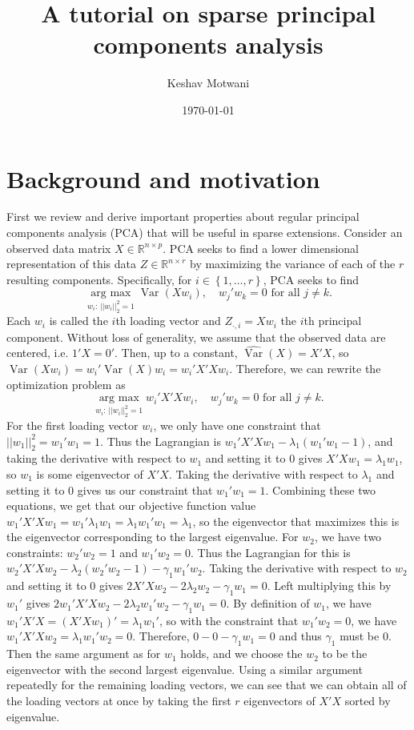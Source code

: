 \documentclass[11pt]{article}
\title{A tutorial on sparse principal components analysis}
\date{\today}
\author{Keshav Motwani}
\newcommand{\argmax}{\operatorname*{arg \ max}}
\newcommand{\var}{\operatorname*{Var}}
\begin{document}
\maketitle
\section{Background and motivation}
First we review and derive important properties about regular principal components analysis (PCA) that will be useful in sparse extensions. Consider an observed data matrix $X \in \mathbb{R}^{n \times p}$. PCA seeks to find a lower dimensional representation of this data $Z \in \mathbb{R}^{n \times r}$ by maximizing the variance of each of the $r$ resulting components. Specifically, for $i \in \left\{1, \dots, r \right\}$, PCA seeks to find
$$
\argmax_{w_i: \,||w_i||_2^2 = 1} \var(Xw_i), \quad w_j'w_k = 0 \text{ for all } j \neq k.
$$
Each $w_i$ is called the $i$th loading vector and $Z_{\cdot, i} = Xw_i$ the $i$th principal component. Without loss of generality, we assume that the observed data are centered, i.e. $1'X = 0'$. Then, up to a constant, $\hat{\var}(X) = X'X$, so $\var(Xw_i) = w_i'\var(X)w_i = w_i'X'Xw_i$. Therefore, we can rewrite the optimization problem as
$$
\argmax_{w_i: \,||w_i||_2^2 = 1} w_i'X'Xw_i, \quad w_j'w_k = 0 \text{ for all } j \neq k.
$$
For the first loading vector $w_i$, we only have one constraint that $||w_1||_2^2 = w_1'w_1 = 1$. Thus the Lagrangian is $w_1'X'Xw_1 -\lambda_1(w_1'w_1 - 1)$, and taking the derivative with respect to $w_1$ and setting it to $0$ gives $X'Xw_1 = \lambda_1 w_1$, so $w_1$ is some eigenvector of $X'X$. Taking the derivative with respect to $\lambda_1$ and setting it to $0$ gives us our constraint that $w_1'w_1 = 1$. Combining these two equations, we get that our objective function value $w_1'X'Xw_1 = w_1' \lambda_1 w_1 = \lambda_1 w_1'w_1 = \lambda_1$, so the eigenvector that maximizes this is the eigenvector corresponding to the largest eigenvalue. For $w_2$, we have two constraints: 
$w_2'w_2 = 1$ and $w_1'w_2 = 0$. Thus the Lagrangian for this is $w_2'X'Xw_2 -\lambda_2(w_2'w_2 - 1) - \gamma_1 w_1'w_2$. Taking the derivative with respect to $w_2$ and setting it to $0$ gives $2X'Xw_2 - 2\lambda_2 w_2 - \gamma_1 w_1 = 0$. Left multiplying this by $w_1'$ gives $2w_1'X'Xw_2 - 2\lambda_2 w_1'w_2 - \gamma_1 w_1 = 0$. By definition of $w_1$, we have $w_1'X'X = (X'Xw_1)' = \lambda_1 w_1'$, so with the constraint that $w_1'w_2 = 0$, we have $w_1'X'Xw_2 = \lambda_1 w_1'w_2 = 0$. Therefore, $0 - 0 - \gamma_1 w_1 = 0$ and thus $\gamma_1$ must be $0$. Then the same argument as for $w_1$ holds, and we choose the $w_2$ to be the eigenvector with the second largest eigenvalue. Using a similar argument repeatedly for the remaining loading vectors, we can see that we can obtain  all of the loading vectors at once by taking the first $r$ eigenvectors of $X'X$ sorted by eigenvalue.
\end{document}
